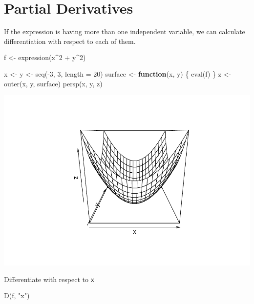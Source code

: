 \documentclass[
]{book}
\newenvironment{Shaded}{\begin{snugshade}}{\end{snugshade}}
\newcommand{\AttributeTok}[1]{\textcolor[rgb]{0.77,0.63,0.00}{#1}}
\newcommand{\ControlFlowTok}[1]{\textcolor[rgb]{0.13,0.29,0.53}{\textbf{#1}}}
\newcommand{\DecValTok}[1]{\textcolor[rgb]{0.00,0.00,0.81}{#1}}
\newcommand{\FunctionTok}[1]{\textcolor[rgb]{0.00,0.00,0.00}{#1}}
\newcommand{\NormalTok}[1]{#1}
\newcommand{\OtherTok}[1]{\textcolor[rgb]{0.56,0.35,0.01}{#1}}
\newcommand{\SpecialCharTok}[1]{\textcolor[rgb]{0.00,0.00,0.00}{#1}}
\newcommand{\StringTok}[1]{\textcolor[rgb]{0.31,0.60,0.02}{#1}}
\begin{document}
\hypertarget{partial-derivatives}{%
\section{Partial Derivatives}\label{partial-derivatives}}

If the expression is having more than one independent variable, we can calculate differentiation with respect to each of them.

\begin{Shaded}
\begin{Highlighting}[]
\NormalTok{f }\OtherTok{\textless{}{-}} \FunctionTok{expression}\NormalTok{(x}\SpecialCharTok{\^{}}\DecValTok{2} \SpecialCharTok{+}\NormalTok{ y}\SpecialCharTok{\^{}}\DecValTok{2}\NormalTok{)}

\NormalTok{x }\OtherTok{\textless{}{-}}\NormalTok{ y }\OtherTok{\textless{}{-}} \FunctionTok{seq}\NormalTok{(}\SpecialCharTok{{-}}\DecValTok{3}\NormalTok{, }\DecValTok{3}\NormalTok{, }\AttributeTok{length =} \DecValTok{20}\NormalTok{)}
\NormalTok{surface }\OtherTok{\textless{}{-}} \ControlFlowTok{function}\NormalTok{(x, y) \{}
  \FunctionTok{eval}\NormalTok{(f)}
\NormalTok{\}}
\NormalTok{z }\OtherTok{\textless{}{-}} \FunctionTok{outer}\NormalTok{(x, y, surface)}
\FunctionTok{persp}\NormalTok{(x, y, z)}
\end{Highlighting}
\end{Shaded}

\includegraphics{bookdown-demo_files/figure-latex/unnamed-chunk-11-1.pdf}

Differentiate with respect to \texttt{x}

\begin{Shaded}
\begin{Highlighting}[]
\FunctionTok{D}\NormalTok{(f, }\StringTok{"x"}\NormalTok{)}
\end{Highlighting}
\end{Shaded}
\end{document}
